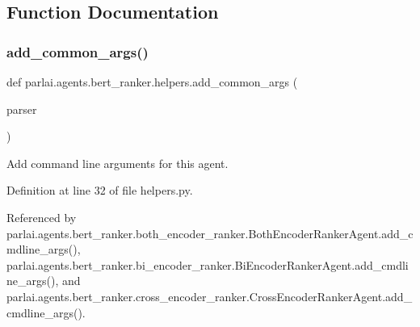 \subsection{Function Documentation}
\mbox{\label{namespaceparlai_1_1agents_1_1bert__ranker_1_1helpers_ac2e926c3aba3a62be09e2c37dffcaee2}} 
\subsubsection{\texorpdfstring{add\+\_\+common\+\_\+args()}{add\_common\_args()}}
{\footnotesize\ttfamily def parlai.\+agents.\+bert\+\_\+ranker.\+helpers.\+add\+\_\+common\+\_\+args (\begin{DoxyParamCaption}\item[{}]{parser }\end{DoxyParamCaption})}

\begin{DoxyVerb}Add command line arguments for this agent.\end{DoxyVerb}
 

Definition at line 32 of file helpers.\+py.



Referenced by parlai.\+agents.\+bert\+\_\+ranker.\+both\+\_\+encoder\+\_\+ranker.\+Both\+Encoder\+Ranker\+Agent.\+add\+\_\+cmdline\+\_\+args(), parlai.\+agents.\+bert\+\_\+ranker.\+bi\+\_\+encoder\+\_\+ranker.\+Bi\+Encoder\+Ranker\+Agent.\+add\+\_\+cmdline\+\_\+args(), and parlai.\+agents.\+bert\+\_\+ranker.\+cross\+\_\+encoder\+\_\+ranker.\+Cross\+Encoder\+Ranker\+Agent.\+add\+\_\+cmdline\+\_\+args().

